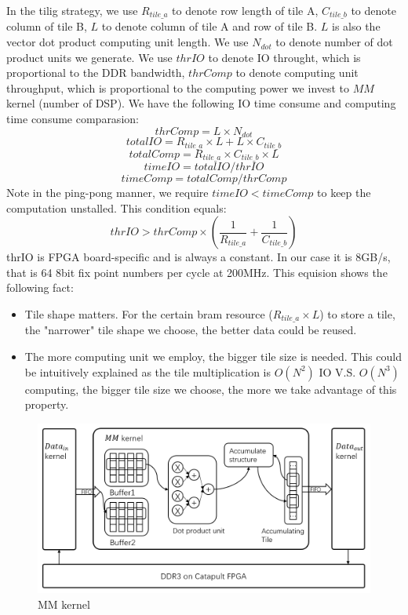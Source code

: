 \documentclass{acm_proc_article-sp-copy}
\begin{document}
In the tilig strategy, we use $R_{tile\_a}$ to denote row length of tile A, $C_{tile\_b}$ to denote column of tile B, $L$ to denote column of tile A and row of tile B. $L$ is also the vector dot product computing unit length. We use $N_{dot}$ to denote number of dot product units we generate. We use $thrIO$ to denote IO throught, which is proportional to the DDR bandwidth, $thrComp$ to denote computing unit throughput, which is proportional to the computing power we invest to $MM$ kernel (number of DSP). We have the following IO time consume and computing time consume comparasion:
\[ thrComp = L \times N_{dot} \]
\[ totalIO= R_{tile\_a} \times L + L \times C_{tile\_b} \]
\[ totalComp = R_{tile\_a} \times C_{tile\_b} \times L \]
\[ timeIO = totalIO / thrIO \]
\[ timeComp = totalComp / thrComp \]
Note in the ping-pong manner, we require $timeIO < timeComp$ to keep the computation unstalled. This condition equals:
\[ thrIO > thrComp \times (\frac{1}{R_{tile\_a}} + \frac{1}{C_{tile\_b}})\]
thrIO is FPGA board-specific and is always a constant. In our case it is 8GB/s, that is 64 8bit fix point numbers per cycle at 200MHz. This equision shows the following fact:
\begin{itemize}
\item Tile shape matters. For the certain bram resource ($R_{tile\_a} \times L$) to store a tile, the "narrower" tile shape we choose, the better data could be reused.
\item The more computing unit we employ, the bigger tile size is needed. This could be intuitively explained as the tile multiplication is $O(N^2)$ IO V.S. $O(N^3)$ computing, the bigger tile size we choose, the more we take advantage of this property.
\end{itemize}

\begin{figure}
	\centering
	\includegraphics[width=1.0\linewidth]{./figure/z/mm.png}
	\caption{MM kernel}
	\label{mm}
\end{figure}
\end{document}
